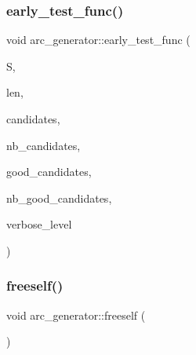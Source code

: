 \subsubsection{\texorpdfstring{early\+\_\+test\+\_\+func()}{early\_test\_func()}}
{\footnotesize\ttfamily void arc\+\_\+generator\+::early\+\_\+test\+\_\+func (\begin{DoxyParamCaption}\item[{\mbox{\hyperlink{galois_8h_a09fddde158a3a20bd2dcadb609de11dc}{I\+NT}} $\ast$}]{S,  }\item[{\mbox{\hyperlink{galois_8h_a09fddde158a3a20bd2dcadb609de11dc}{I\+NT}}}]{len,  }\item[{\mbox{\hyperlink{galois_8h_a09fddde158a3a20bd2dcadb609de11dc}{I\+NT}} $\ast$}]{candidates,  }\item[{\mbox{\hyperlink{galois_8h_a09fddde158a3a20bd2dcadb609de11dc}{I\+NT}}}]{nb\+\_\+candidates,  }\item[{\mbox{\hyperlink{galois_8h_a09fddde158a3a20bd2dcadb609de11dc}{I\+NT}} $\ast$}]{good\+\_\+candidates,  }\item[{\mbox{\hyperlink{galois_8h_a09fddde158a3a20bd2dcadb609de11dc}{I\+NT}} \&}]{nb\+\_\+good\+\_\+candidates,  }\item[{\mbox{\hyperlink{galois_8h_a09fddde158a3a20bd2dcadb609de11dc}{I\+NT}}}]{verbose\+\_\+level }\end{DoxyParamCaption})}

\mbox{\label{classarc__generator_aa46fc8a0cfb3f92b306b1f6825d0f1a0}} 
\subsubsection{\texorpdfstring{freeself()}{freeself()}}
{\footnotesize\ttfamily void arc\+\_\+generator\+::freeself (\begin{DoxyParamCaption}{ }\end{DoxyParamCaption})}

\mbox{\label{classarc__generator_ae614e18e9c641d67069fa27d48245cde}} 
